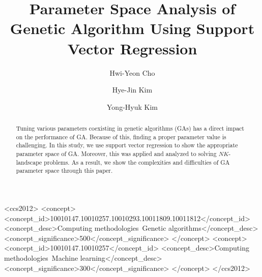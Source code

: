 \documentclass[format=sigconf]{acmart}
\begin{document}

\title{Parameter Space Analysis of Genetic Algorithm Using Support Vector Regression}

\author{Hwi-Yeon Cho}

\author{Hye-Jin Kim}

\author{Yong-Hyuk Kim}


\renewcommand{\shortauthors}{H.-Y. Cho et al.}

\begin{abstract}
  Tuning various parameters coexisting in genetic algorithms (GAs) has a direct impact on the performance of GA. Because of this, finding a proper parameter value is challenging. In this study, we use support vector regression to show the appropriate parameter space of GA. Moreover, this was applied and analyzed to solving $NK$-landscape problems. As a result, we show the complexities and difficulties of GA parameter space through this paper.
\end{abstract}

\begin{CCSXML}
  <ccs2012>
    <concept>
      <concept_id>10010147.10010257.10010293.10011809.10011812</concept_id>
      <concept_desc>Computing methodologies~Genetic algorithms</concept_desc>
      <concept_significance>500</concept_significance>
    </concept>
    <concept>
      <concept_id>10010147.10010257</concept_id>
      <concept_desc>Computing methodologies~Machine learning</concept_desc>
      <concept_significance>300</concept_significance>
    </concept>
  </ccs2012>
\end{CCSXML}
\end{document}
